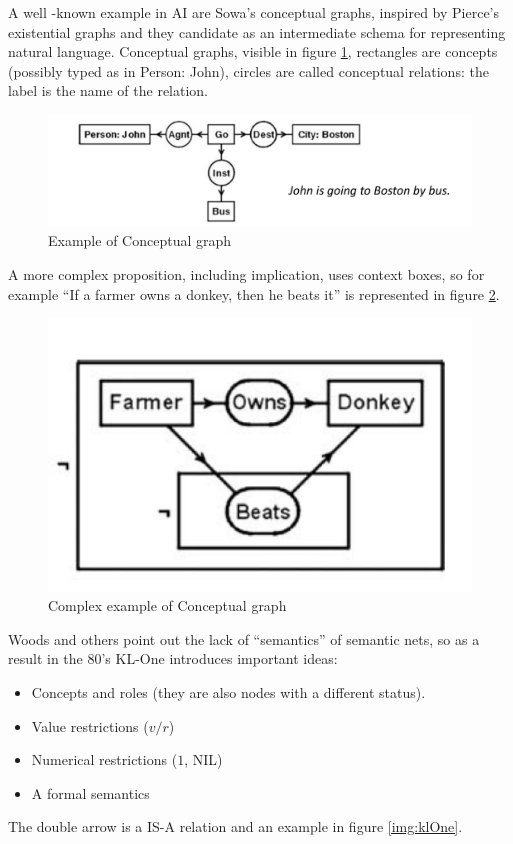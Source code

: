 A well -known example in AI are Sowa’s conceptual graphs, inspired by Pierce’s
existential graphs and they candidate as an intermediate schema for representing
natural language.\newline
Conceptual graphs, visible in figure \ref{img:conceptual}, rectangles are concepts
(possibly typed as in Person: John), circles are called conceptual relations:
the label is the name of the relation.

\begin{figure}
	\includegraphics[width=\textwidth]{Images/conceptualGraph}
	\caption{Example of Conceptual graph}
	\label{img:conceptual}
\end{figure}

A more complex proposition, including implication, uses context boxes, so for example
“If a farmer owns a donkey, then he beats it” is represented in figure \ref{img:context}.

\begin{figure}
	\includegraphics[width=\textwidth]{Images/complexConceptual}
	\caption{Complex example of Conceptual graph}
	\label{img:context}
\end{figure}
Woods and others point out the lack of “semantics” of semantic nets, so as a result
in the $80$’s KL-One introduces important ideas:
\begin{itemize}
   \item Concepts and roles (they are also nodes with a different status).
   \item Value restrictions ($v/r$)
   \item Numerical restrictions ($1$, NIL)
   \item A formal semantics
\end{itemize}
The double arrow is a IS-A relation and an example in figure \ref{img:klOne}.

